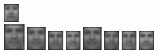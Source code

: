 \begin{figure}[hbt]
  \includegraphics[width=0.07\textwidth]{../results/L_rez/correct80/1/10.jpg} \\
  \vspace{4pt}
  \includegraphics[width=0.1\textwidth]{../results/L_rez/correct80/2/testImg.jpg} \vline
  \hspace{2pt}
  \includegraphics[width=0.09\textwidth]{../results/L_rez/correct80/2/1.jpg}
  \includegraphics[width=0.073\textwidth]{../results/L_rez/correct80/2/2.jpg}
  \includegraphics[width=0.073\textwidth]{../results/L_rez/correct80/2/3.jpg}
  \includegraphics[width=0.09\textwidth]{../results/L_rez/correct80/2/4.jpg}
  \includegraphics[width=0.073\textwidth]{../results/L_rez/correct80/2/5.jpg}
  \includegraphics[width=0.073\textwidth]{../results/L_rez/correct80/2/6.jpg}
  \includegraphics[width=0.073\textwidth]{../results/L_rez/correct80/2/7.jpg}

\end{figure}
